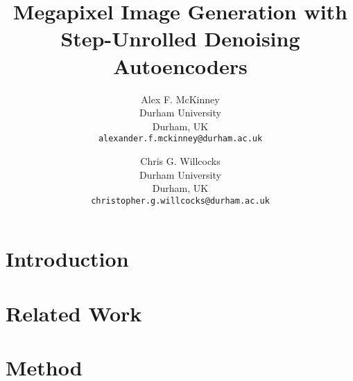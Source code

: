 \documentclass[10pt,twocolumn,letterpaper]{article}
\begin{document}
\title{Megapixel Image Generation with Step-Unrolled Denoising Autoencoders}

\author{Alex F. McKinney\\
Durham University\\
Durham, UK\\
{\tt\small alexander.f.mckinney@durham.ac.uk}
\and
Chris G. Willcocks\\
Durham University\\
Durham, UK\\
{\tt\small christopher.g.willcocks@durham.ac.uk}
}
\maketitle

\begin{abstract}
    
\end{abstract}

\section{Introduction}
\label{sec:intro}


\section{Related Work}
\label{sec:related}


\section{Method}
\label{sec:method}


{\small


}
\end{document}
